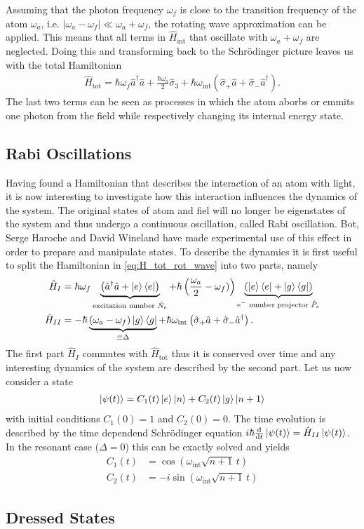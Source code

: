 Assuming that the photon frequency $\omega_f$ is close to the transition
frequency of the atom $\omega_a$, i.e. $\left| \omega_a-\omega_f \right|
\ll \omega_a+\omega_f $, the rotating wave approximation can be applied. This
means that all terms in $\hat{H}_{\text{int}}$ that oscillate with
$\omega_a+\omega_f$ are
neglected. Doing this and transforming back to the Schrödinger picture leaves us
with the total Hamiltonian
\begin{align}
  \label{eq:H_tot_rot_wave}
  \hat{H}_{\text{tot}}= \hbar \omega_f \hat{a}^\dagger \hat{a} + \frac{\hbar\omega_a}{2}\hat{\sigma}_3
  + \hbar \omega_{\text{int}}\left( \hat{\sigma}_+\hat{a} +
  \hat{\sigma}_-\hat{a}^\dagger  \right).
\end{align}
The last two terms can be seen as processes in which the atom aborbs or emmits
one photon from the field while respectively changing its internal energy state.

\subsection{Rabi Oscillations}
Having found a Hamiltonian that describes the interaction of an atom with light,
it is now interesting to investigate how this interaction influences the
dynamics of the system. The original states of atom and fiel will no longer be
eigenstates of the system and thus undergo a continuous oscillation, called Rabi
oscillation. Bot, Serge Haroche and David Wineland have made experimental use of
this effect in order to prepare and manipulate states. To describe the dynamics
it is first useful to split the Hamiltonian in \eqref{eq:H_tot_rot_wave} into
two parts, namely
\begin{align}
  \label{eq:H_I_H_II}
  \hat{H}_I &= \hbar\omega_f\underbrace{\left( \hat{a}^\dagger\hat{a} +
  \ket{e}\bra{e}\right)}_{\text{excitation number }\hat{N}_e} + \hbar \left( \frac{\omega_a}{2} -
\omega_f)\right)\underbrace{\left(\ket{e}\bra{e} +
\ket{g}\bra{g}\right)}_{\text{e$^-$ number projector }\hat{P}_e} \\
\hat{H}_{II} &= -\hbar \underbrace{\left(\omega_a -
\omega_f\right)\ket{g}\bra{g}}_{\equiv\Delta} +
\hbar\omega_{\text{int}}\left( \hat{\sigma}_+\hat{a} +
  \hat{\sigma}_-\hat{a}^\dagger  \right).
\end{align}
The first part $\hat{H}_I$ commutes with $\hat{H}_{\text{tot}}$ thus it is
conserved over time and any interesting dynamics of the system are described by
the second part. Let us now consider a state
\begin{align}
  \label{eq:psi_t}
  \ket{\psi(t)} = C_1(t)\ket{e}\ket{n} + C_2(t)\ket{g}\ket{n+1} 
\end{align}
with initial conditions $C_1(0) = 1$ and $C_2(0)=0$. The time evolution is
described by the time dependend Schrödinger equation
$i\hbar\frac{\text{d}}{\text{d}t}\ket{\psi(t)}
= \hat{H}_{II}\ket{\psi(t)}$. In the resonant case ($\Delta=0$) this can be
exactly solved and yields
\begin{align}
  \label{eq:psi_t_solution}
  C_1(t) &= \cos\left(\omega_{\text{int}}\sqrt{n+1}\,t\right) \\
  C_2(t) &= -i\sin\left(\omega_\text{int} \sqrt{n+1} \,t\right)
\end{align}

\subsection{Dressed States}

